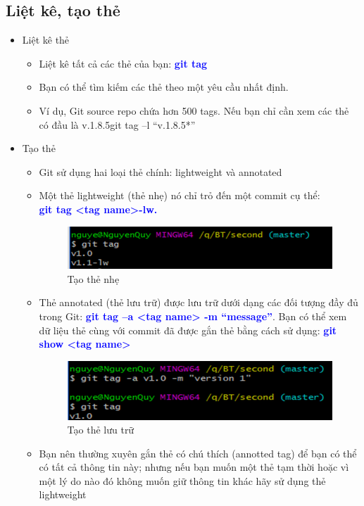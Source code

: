 \documentclass[12pt,a4paper]{report}
\begin{document}
\subsection{Liệt kê, tạo thẻ}
\begin{itemize}
\item Liệt kê thẻ
	\begin{itemize}
		\item Liệt kê tất cả các thẻ của bạn: \textcolor{blue}{\bf git tag}
		\item Bạn có thể tìm kiếm các thẻ theo một yêu cầu nhất định. 
		\item Ví dụ, Git source repo chứa hơn 500 tags. Nếu bạn chỉ cần xem các thẻ có đầu là v.1.8.5git tag –l “v.1.8.5*”
	\end{itemize}
\item Tạo thẻ
	\begin{itemize}
		\item Git sử dụng hai loại thẻ chính: lightweight và annotated
		\item Một thẻ lightweight (thẻ nhẹ) nó chỉ trỏ đến một commit cụ thể:\\ \textcolor{blue}{\bf git tag <tag name>-lw.}
		
		\begin{figure}[!ht]
	\centering
	\includegraphics[width=0.8\linewidth]{screenshot042}
\caption{Tạo thẻ nhẹ}
	\label{fig:screenshot042}
\end{figure}

		\item Thẻ annotated (thẻ lưu trữ) được lưu trữ dưới dạng các đối tượng đầy đủ trong Git: \textcolor{blue}{\bf git tag –a <tag name> -m “message”}. Bạn có thể xem dữ liệu thẻ cùng với commit đã được gắn thẻ bằng cách sử dụng: \textcolor{blue}{\bf git show <tag name>}

\begin{figure}[!ht]
	\centering
	\includegraphics[width=0.8\linewidth]{screenshot043}
\caption{Tạo thẻ lưu trữ}
	\label{fig:screenshot043}
\end{figure}

		\item Bạn nên thường xuyên gắn thẻ có chú thích (annotted tag) để bạn có thể có tất cả thông tin này; nhưng nếu bạn muốn một thẻ tạm thời hoặc vì một lý do nào đó không muốn giữ thông tin khác hãy sử dụng thẻ lightweight
\end{itemize}
\end{itemize}
\end{document}
